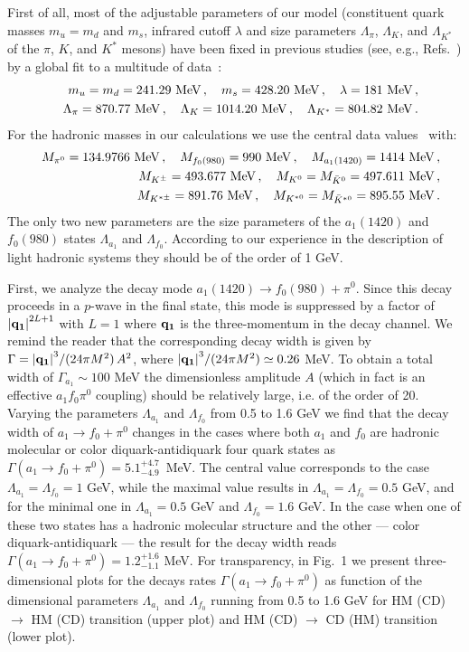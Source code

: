 \documentclass[aps,prd,floatfix,superscriptaddress,showpacs,showkeys]{revtex4}
\newcommand{\bea}{\begin{eqnarray}}
\newcommand{\ena}{\end{eqnarray}}
\begin{document}
First of all, most of the adjustable parameters
of our model (constituent quark masses $m_u = m_d$ and $m_s$, 
infrared cutoff $\lambda$ and size
parameters $\Lambda_\pi$, $\Lambda_K$, and $\Lambda_{K^*}$ 
of the $\pi$, $K$, and $K^*$ mesons) have been fixed in previous 
studies (see, e.g., Refs.~\cite{Gutsche:2015mxa,Issadykov:2015iba}) 
by a global fit to a multitude of data~\cite{Olive:2016xmw}: 
\bea 
& &
m_u = m_d = 241.29 \ {\rm MeV}\,, \quad  
m_s = 428.20 \ {\rm MeV}\,, \quad 
\lambda = 181 \ {\rm MeV}\,, \nonumber\\
& &
\Lambda_\pi   =  870.77 \ {\rm MeV}\,, \quad 
\Lambda_K     = 1014.20 \ {\rm MeV}\,, \quad 
\Lambda_{K^*} =  804.82 \ {\rm MeV}\,. 
\ena 
For the  hadronic masses in our calculations 
we use the central data values~\cite{Olive:2016xmw} with: 
\bea
& &
M_{\pi^0} = 134.9766 \ {\rm MeV}\,, \quad  
M_{f_0(980)}  =  990 \ {\rm MeV}\,, \quad  
M_{a_1(1420)} = 1414 \ {\rm MeV}\,, \nonumber\\
& &
M_{K^\pm} = 493.677  \ {\rm MeV}\,, \quad  
M_{K^0} = M_{\bar K^0} = 497.611  \ {\rm MeV}
\,, \nonumber\\ 
& &
M_{K^{* \pm}} = 891.76 \ {\rm MeV}\,, \quad  
M_{K^{* 0}} = M_{\bar K^{* 0}} = 895.55 \ {\rm MeV}
\,. 
\ena 
The only two new parameters are the size parameters of the $a_1(1420)$ 
and $f_0(980)$ states $\Lambda_{a_1}$ and $\Lambda_{f_0}$. 
According to our experience in the description of light 
hadronic systems they should be of the order of 1 GeV. 

First, we analyze the decay mode $a_1(1420) \to f_0(980) + \pi^0$.  
Since this decay proceeds in a $p$-wave in the final state, this mode 
is suppressed by a factor of ${\bf|q_1|}^{2L+1}$ with $L=1$ 
where ${\bf q_1}$ is the three-momentum in the decay channel. 
We remind the reader that the corresponding decay width is 
given by $\Gamma = {\bf|q_1|}^3/(24\pi M^2) \, A^2$,  
where ${\bf|q_1|}^3/(24 \pi M^2) \simeq 0.26$ MeV. 
To obtain a total width of $\Gamma_{a_1} \sim 100$ MeV the 
dimensionless amplitude $A$ (which in fact is an effective 
$a_1f_0\pi^0$ coupling) should be relatively large, 
i.e. of the order of 20. 
Varying the parameters $\Lambda_{a_1}$ and $\Lambda_{f_0}$ 
from 0.5 to 1.6 GeV we find that the decay width of $a_1 \to f_0 + \pi^0$ 
changes in the cases where both $a_1$ and $f_0$ are hadronic molecular 
or color diquark-antidiquark four quark states as 
$\Gamma(a_1 \to f_0 + \pi^0) = 5.1^{+4.7}_{-4.9}$~MeV. 
The central value corresponds to the case 
$\Lambda_{a_1} = \Lambda_{f_0} = 1$ GeV, 
while the maximal value results in 
$\Lambda_{a_1} = \Lambda_{f_0} = 0.5$ GeV, and 
for the minimal one in 
$\Lambda_{a_1} = 0.5$ GeV and $\Lambda_{f_0} = 1.6$ GeV. 
In the case when one of these two states has a hadronic molecular 
structure and the other --- color diquark-antidiquark --- the result 
for the decay width reads 
$\Gamma(a_1 \to f_0 + \pi^0) = 1.2^{+1.6}_{-1.1}$ MeV. 
For transparency, in Fig.~1 we present three-dimensional plots for the decays 
rates 
$\Gamma(a_1 \to f_0 + \pi^0)$ as function of the dimensional parameters 
$\Lambda_{a_1}$ and $\Lambda_{f_0}$ running from 0.5 to 1.6 GeV 
for HM (CD) $\to$ HM (CD) transition (upper plot) and 
HM (CD) $\to$ CD (HM) transition (lower plot). 
\end{document}

